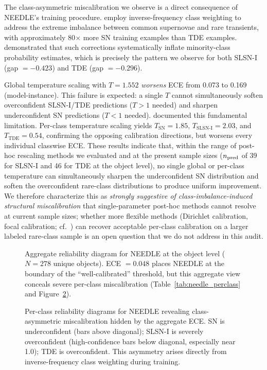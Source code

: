 \documentclass[twocolumn]{aastex631}
\begin{document}
The class-asymmetric miscalibration we observe is a direct consequence of NEEDLE's training procedure. \citet{sheng2024} employ inverse-frequency class weighting to address the extreme imbalance between common supernovae and rare transients, with approximately 80$\times$ more SN training examples than TDE examples. \citet{vandengoorbergh2022} demonstrated that such corrections systematically inflate minority-class probability estimates, which is precisely the pattern we observe for both SLSN-I (gap $= -0.423$) and TDE (gap $= -0.296$).

Global temperature scaling with $T = 1.552$ \emph{worsens} ECE from 0.073 to 0.169 (model-instance). This failure is expected: a single $T$ cannot simultaneously soften overconfident SLSN-I/TDE predictions ($T > 1$ needed) and sharpen underconfident SN predictions ($T < 1$ needed). \citet{kull2019} documented this fundamental limitation. Per-class temperature scaling yields $T_{\text{SN}} = 1.85$, $T_{\text{SLSN-I}} = 2.03$, and $T_{\text{TDE}} = 0.54$, confirming the opposing calibration directions, but worsens every individual classwise ECE. These results indicate that, within the range of post-hoc rescaling methods we evaluated and at the present sample sizes ($n_{\rm pred}$ of 39 for SLSN-I and 46 for TDE at the object level), no single global or per-class temperature can simultaneously sharpen the underconfident SN distribution and soften the overconfident rare-class distributions to produce uniform improvement. We therefore characterize this as \textit{strongly suggestive of class-imbalance-induced structural miscalibration} that single-parameter post-hoc methods cannot resolve at current sample sizes; whether more flexible methods (Dirichlet calibration, focal calibration; cf.\ \citealt{kull2019, mukhoti2020}) can recover acceptable per-class calibration on a larger labeled rare-class sample is an open question that we do not address in this audit.

\begin{figure}
\caption{Aggregate reliability diagram for NEEDLE at the object level ($N = 278$ unique objects). ECE $= 0.048$ places NEEDLE at the boundary of the ``well-calibrated'' threshold, but this aggregate view conceals severe per-class miscalibration (Table~\ref{tab:needle_perclass} and Figure~\ref{fig:needle_perclass}). \label{fig:needle_aggregate}}
\end{figure}

\begin{figure}
\caption{Per-class reliability diagrams for NEEDLE revealing class-asymmetric miscalibration hidden by the aggregate ECE. SN is underconfident (bars above diagonal); SLSN-I is severely overconfident (high-confidence bars below diagonal, especially near 1.0); TDE is overconfident. This asymmetry arises directly from inverse-frequency class weighting during training. \label{fig:needle_perclass}}
\end{figure}
\end{document}

